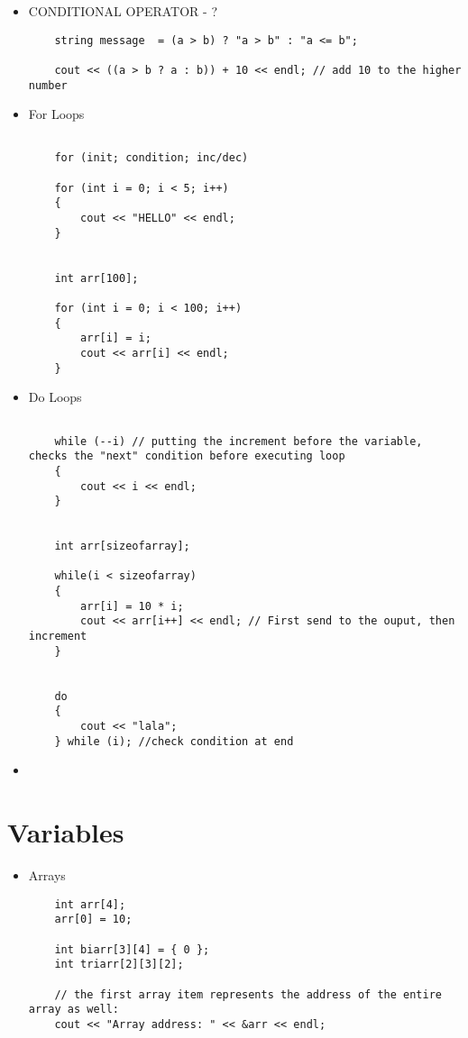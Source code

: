\documentclass{article}
\begin{document}
\begin{itemize}
\begin{lstlisting}
\end{lstlisting}

\item{CONDITIONAL OPERATOR - ?}
\begin{lstlisting}
	string message  = (a > b) ? "a > b" : "a <= b";

	cout << ((a > b ? a : b)) + 10 << endl; // add 10 to the higher number
\end{lstlisting}


\item{For Loops}
\begin{lstlisting}

	for (init; condition; inc/dec)
	
	for (int i = 0; i < 5; i++)
	{
		cout << "HELLO" << endl;
	}
	
	
	int arr[100];

	for (int i = 0; i < 100; i++)
	{
		arr[i] = i;
		cout << arr[i] << endl;
	}

\end{lstlisting}


\item{Do Loops}
\begin{lstlisting}

	while (--i) // putting the increment before the variable, checks the "next" condition before executing loop
	{
		cout << i << endl;
	}
	
	
	int arr[sizeofarray];
	
	while(i < sizeofarray)
	{
		arr[i] = 10 * i;
		cout << arr[i++] << endl; // First send to the ouput, then increment
	}
	
	
	do
	{
		cout << "lala";
	} while (i); //check condition at end

\end{lstlisting}



\item{}
\begin{lstlisting}

\end{lstlisting}



\end{itemize}






\section{Variables}

\begin{itemize}

\item{Arrays}
\begin{lstlisting}
	int arr[4];
	arr[0] = 10;

	int biarr[3][4] = { 0 };
	int triarr[2][3][2];

	// the first array item represents the address of the entire array as well:
	cout << "Array address: " << &arr << endl;
	
	
\end{lstlisting}

\end{itemize}
\end{document}
